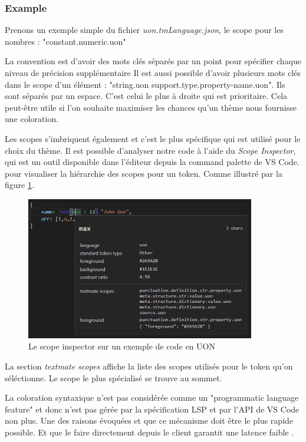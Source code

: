 \documentclass[
    iict, %
    il, %
]{heig-tb}
\begin{document}
\subsubsection{Example}
Prenons un exemple simple du fichier \emph{uon.tmLanguage.json}, le scope pour les nombres : "constant.numeric.uon"

La convention est d'avoir des mots clés séparés par un point pour spécifier chaque niveau de précision supplémentaire
Il est aussi possible d'avoir plusieurs mots clés dans le scope d'un élément : "string.uon support.type.property-name.uon". Ils sont séparés par un espace.
C'est celui le plus à droite qui est prioritaire. Cela peut-être utile si l'on souhaite maximiser les chances qu'un thème nous fournisse une coloration.
\cite{scopes-selectors}

Les scopes s'imbriquent également et c'est le plus spécifique qui est utilisé pour le choix du thème.
Il est possible d'analyser notre code à l'aide du \emph{Scope Inspector}, qui est un outil disponible dans l'éditeur depuis la command palette de VS Code.
pour visualiser la hiérarchie des scopes pour un token. Comme illustré par la figure \ref{scope-inspector}.

\begin{figure}[!h]
    \begin{center}
        \includegraphics[width=10cm]{assets/figures/scope-inspector.png}
    \end{center}
    \caption[Scope inspector]{\label{scope-inspector} Le scope inspector sur un exemple de code en UON}
\end{figure}

La section \emph{textmate scopes} affiche la liste des scopes utilisés pour le token qu'on séléctionne. Le scope le plus spécialisé se trouve au sommet.

La coloration syntaxique n'est pas considérée comme un "programmatic language feature" et donc n'est pas gérée par la spécification LSP et par l'API de VS Code non plus.
Une des raisons évoquées et que ce mécanisme doit être le plus rapide possible. Et que le faire directement depuis le client garantit une latence faible
\cite{syntax-highlighting-editor}.
\end{document}
